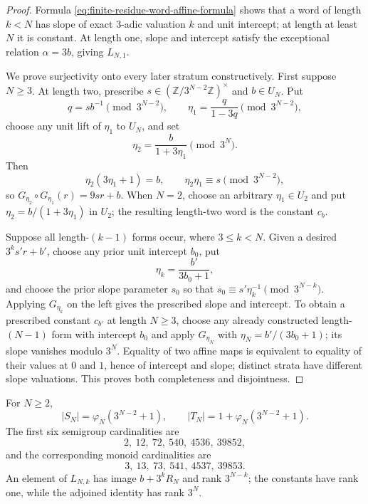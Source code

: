 \begin{proof}
Formula \eqref{eq:finite-residue-word-affine-formula} shows that a word of
length $k<N$ has slope of exact $3$-adic valuation $k$ and unit intercept;
at length at least $N$ it is constant.  At length one, slope and intercept
satisfy the exceptional relation $\alpha=3b$, giving $L_{N,1}$.

We prove surjectivity onto every later stratum constructively.  First suppose
$N\geq3$.  At length two, prescribe
$s\in(\mathbb Z/3^{N-2}\mathbb Z)^\times$ and $b\in U_N$.
Put
\[
 q=sb^{-1}\pmod{3^{N-2}},
 \qquad
 \eta_1=\frac q{1-3q}\pmod{3^{N-2}},
\]
choose any unit lift of $\eta_1$ to $U_N$, and set
\[
 \eta_2=\frac b{1+3\eta_1}\pmod{3^N}.
\]
Then
\[
 \eta_2(3\eta_1+1)=b,
 \qquad \eta_2\eta_1\equiv s\pmod{3^{N-2}},
\]
so $G_{\eta_2}\circ G_{\eta_1}(r)=9sr+b$.  When $N=2$, choose an arbitrary
$\eta_1\in U_2$ and put $\eta_2=b/(1+3\eta_1)$ in $U_2$; the resulting
length-two word is the constant $c_b$.

Suppose all length-$(k-1)$ forms occur, where $3\leq k<N$.  Given a desired
$3^ks'r+b'$, choose any prior unit intercept $b_0$, put
\[
 \eta_k=\frac{b'}{3b_0+1},
\]
and choose the prior slope parameter $s_0$ so that
$s_0\equiv s'\eta_k^{-1}\pmod{3^{N-k}}$.  Applying $G_{\eta_k}$ on the left
gives the prescribed slope and intercept.  To obtain a prescribed constant
$c_{b'}$ at length $N\geq3$, choose any already constructed length-$(N-1)$
form with intercept $b_0$ and apply
$G_{\eta_N}$ with $\eta_N=b'/(3b_0+1)$; its slope vanishes modulo $3^N$.
Equality of two affine maps is equivalent to equality of their
values at $0$ and $1$, hence of intercept and slope; distinct strata have
different slope valuations.  This proves both completeness and disjointness.
\end{proof}

\begin{corollary}
\label{cor:finite-residue-cardinalities-ranks}
For $N\geq2$,
\begin{equation}
\label{eq:finite-residue-cardinality}
 |S_N|=\varphi_N(3^{N-2}+1),
 \qquad
 |T_N|=1+\varphi_N(3^{N-2}+1).
\end{equation}
The first six semigroup cardinalities are
\[
 2,\ 12,\ 72,\ 540,\ 4536,\ 39852,
\]
and the corresponding monoid cardinalities are
\[
 3,\ 13,\ 73,\ 541,\ 4537,\ 39853.
\]
An element of $L_{N,k}$ has image $b+3^kR_N$ and rank $3^{N-k}$;
the constants have rank one, while the adjoined identity has rank $3^N$.
\end{corollary}

